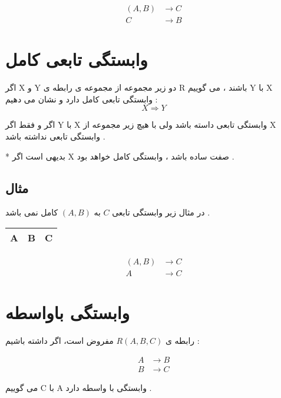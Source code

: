 \documentclass{article}
\begin{document}
\begin{align*}
(A,B) &\to C \\
C &\to B
\end{align*}




\newpage

\section{وابستگی تابعی کامل}

اگر X و Y دو زیر مجموعه از مجموعه ی رابطه ی R باشند ، می گوییم Y با X وابستگی تابعی کامل دارد و نشان می دهیم :
$$
X \Rightarrow Y
$$

اگر و فقط اگر Y با X وابستگی تابعی داسته باشد ولی با هیچ زیر مجموعه از X وابستگی تابعی نداشته باشد .


* بدیهی است اگر X صفت ساده باشد ، وابستگی کامل خواهد بود . 


\subsection{مثال}

در مثال زیر وابستگی تابعی $ C $ به $ (A, B) $ کامل نمی باشد .

\begin{latin}
\begin{center}
  \bgroup
  \def\arraystretch{1.5}%
  \begin{tabular}{  c | c | c }
    A & B & C \\
    \hline
    \hline
    \hline
  \end{tabular}
  \egroup
\end{center}
\end{latin}

\begin{align*}
(A,B) &\to C \\
A &\to C
\end{align*}




\section{وابستگی باواسطه}

رابطه ی $R(A,B,C)$  مفروض است، اگر داشته باشیم :

\begin{align*}
A &\to B \\
B &\to C
\end{align*}

می گوییم C با A وابستگی با واسطه دارد .
\end{document}
